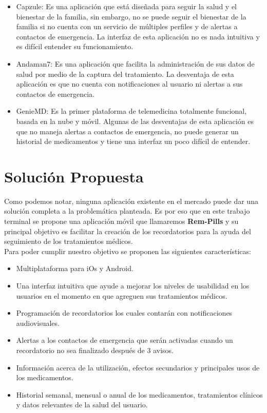 \begin{itemize}
	\item Capzule: Es una aplicación que está diseñada para seguir la salud y el bienestar de la familia, sin embargo, no se puede seguir el bienestar de la familia si no cuenta con un servicio de múltiples perfiles y de alertas a contactos de emergencia. La interfaz de esta aplicación no es nada intuitiva y es difícil entender su funcionamiento.

	\item Andaman7: Es una aplicación que facilita la administración de sus datos de salud por medio de la captura del tratamiento. La desventaja de esta aplicación es que no cuenta con notificaciones al usuario ni alertas a sus contactos de emergencia. 
	
	\item GenieMD: Es la primer plataforma de telemedicina totalmente funcional, basada en la nube y móvil. Algunas de las desventajas de esta aplicación es que no maneja alertas a contactos de emergencia, no puede generar un historial de medicamentos y tiene una interfaz un poco difícil de entender.
	
\end{itemize}

	
\section{Solución Propuesta}
Como podemos notar, ninguna aplicación existente en el mercado puede dar una solución completa a la problemática planteada.
Es por eso que en este trabajo terminal se propone una aplicación móvil que llamaremos \textbf{Rem-Pills} y su principal objetivo es facilitar la creación de los recordatorios para la ayuda del seguimiento de los tratamientos médicos.\\
Para poder cumplir nuestro objetivo se proponen las siguientes características:
\begin{itemize}
	\item Multiplataforma para iOs y Android.
	
	\item Una interfaz intuitiva que ayude a mejorar los niveles de usabilidad en los usuarios en el momento en que agreguen sus tratamientos médicos.
	
	\item Programación de recordatorios los cuales contarán con notificaciones audiovisuales.
	
	\item Alertas a los contactos de emergencia que serán activadas cuando un recordatorio no sea finalizado después de 3 avisos.
	
	\item Información acerca de la utilización, efectos secundarios y principales usos de los medicamentos.
	
	\item Historial semanal, mensual o anual de los medicamentos, tratamientos clínicos y datos relevantes de la salud del usuario.
	
\end{itemize}



